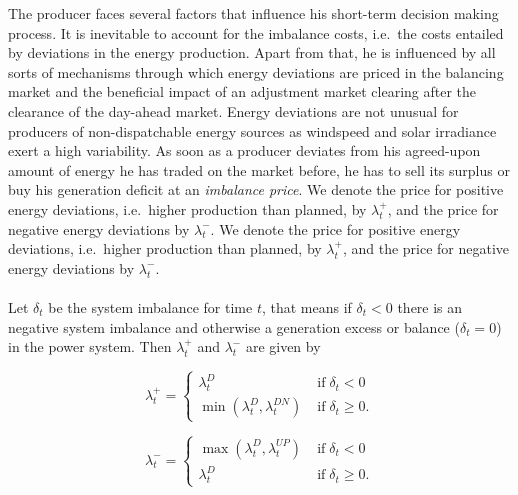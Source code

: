 The producer faces several factors that influence his short-term decision making process. It is inevitable to account for the imbalance costs, i.e.\ the costs entailed by deviations in the energy production. Apart from that, he is influenced by all sorts of mechanisms through which energy deviations are priced in the balancing market and the beneficial impact of an adjustment market clearing after the clearance of the day-ahead market. Energy deviations are not unusual for producers of non-dispatchable energy sources as windspeed and solar irradiance exert a high variability. As soon as a producer deviates from his agreed-upon amount of energy he has traded on the market before, he has to sell its surplus or buy his generation deficit at an \textit{imbalance price}. We denote the price for positive energy deviations, i.e.\ higher production than planned, by $\lambda_{t}^{+}$, and the price for negative energy deviations by $\lambda_{t}^{-}$. 
We denote the price for positive energy deviations, i.e.\ higher production than planned, by $\lambda_{t}^{+}$, and the price for negative energy deviations by $\lambda_{t}^{-}$.
\\ \\
Let $\delta_t$ be the system imbalance for time $t$, that means if $\delta_t<0$ there is an negative system imbalance and otherwise a generation excess or balance ($\delta_t=0$) in the power system. Then $\lambda_t^+$ and $\lambda_t^-$ are given by 
\begin{figure}[h!]
	\begin{minipage}{0.5\textwidth}
		\begin{equation*}
			\lambda_{t}^+=\begin{cases}
				\lambda_{t}^D &\mathrm{\; if \;} \delta_{t}<0
				\\ \min(\lambda_t^D,\lambda_t^{DN}) &\mathrm{\; if \;} \delta_{t}\ge 0.
			\end{cases}
		\end{equation*}
	\end{minipage}
	\hfill
	\begin{minipage}{0.5\textwidth}
		\begin{equation*}
			\lambda_t^-=\begin{cases}
				\max(\lambda_t^D,\lambda_t^{UP}) &\mathrm{\; if \;} \delta_{t}<0
				\\ \lambda_{t}^{D} &\mathrm{\; if \;} \delta_{t}\ge 0.
			\end{cases}
		\end{equation*}
	\end{minipage}
\end{figure}

